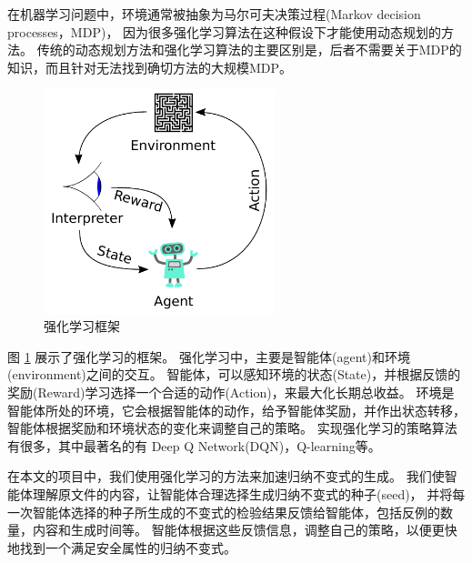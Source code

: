 在机器学习问题中，环境通常被抽象为马尔可夫决策过程(Markov decision processes，MDP)\cite{markov}，
因为很多强化学习算法在这种假设下才能使用动态规划的方法。
传统的动态规划方法和强化学习算法的主要区别是，后者不需要关于MDP的知识，而且针对无法找到确切方法的大规模MDP。

\begin{figure}
    \centering
    \includegraphics[width=0.6\textwidth]{figures/Reinforcement_learning_diagram.pdf}
    \caption{强化学习框架}
    \label{fig:rl}
\end{figure}
图 \ref{fig:rl} 展示了强化学习的框架。
强化学习中，主要是智能体(agent)和环境(environment)之间的交互。
智能体，可以感知环境的状态(State)，并根据反馈的奖励(Reward)学习选择一个合适的动作(Action)，来最大化长期总收益。
环境是智能体所处的环境，它会根据智能体的动作，给予智能体奖励，并作出状态转移，智能体根据奖励和环境状态的变化来调整自己的策略。
实现强化学习的策略算法有很多，其中最著名的有 Deep Q Network(DQN)\cite{dqn}，Q-learning\cite{q-learning}等。

在本文的项目中，我们使用强化学习的方法来加速归纳不变式的生成。
我们使智能体理解\TLA 原文件的内容，让智能体合理选择生成归纳不变式的种子(seed)，
并将每一次智能体选择的种子所生成的不变式的检验结果反馈给智能体，包括反例的数量，内容和生成时间等。
智能体根据这些反馈信息，调整自己的策略，以便更快地找到一个满足安全属性的归纳不变式。


